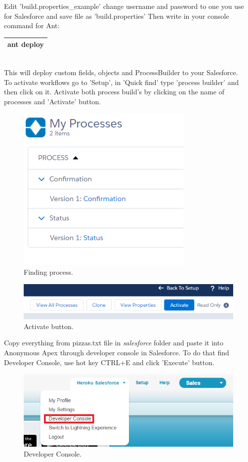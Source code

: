 \documentclass[12pt,a4paper]{article}
\begin{document}
Edit 'build.properties\_example' change username and password to one you use for Salesforce and save file as 'build.properties'
Then write in your console command for Ant:

\begin{tabular}{|l|}
	\hline
	ant deploy\\
	\hline
\end{tabular}\\


This will deploy custom fields, objects and ProcessBuilder to your  Salesforce.\\
To activate workflows go to 'Setup', in 'Quick find' type 'process builder' and then click on it. Activate both process build's by clicking on the name of processes and 'Activate' button.
\begin{figure}[H]
	\centering
	\includegraphics{images/process.PNG}
	\caption{Finding process.}
	\label{fig:process}
\end{figure}
\begin{figure}[H]
	\centering
	\includegraphics{images/process2.PNG}
	\caption{Activate button.}
	\label{fig:processs}
\end{figure}

Copy everything from pizzas.txt file in \textit{salesforce} folder and paste it into Anonymous Apex through developer console in Salesforce.
To do that find Developer Console, use hot key CTRL+E and click 'Execute' button.

\begin{figure}[H]
	\centering
	\includegraphics[width=1\textwidth]{images/deploy1.PNG}
	\caption{Developer Console.}
	\label{fig:console}
\end{figure}
\end{document}
